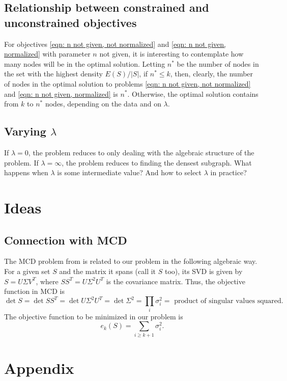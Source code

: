 \documentclass{article}
\begin{document}
\subsection{Relationship between constrained and unconstrained objectives}
For objectives \ref{eqn: n not given, not normalized} and \ref{eqn: n not given, normalized} with parameter $n$ not given, it is interesting to contemplate how many nodes will be in the optimal solution. Letting $n^*$ be the number of nodes in the set with the highest density $E(S)/|S|$,
if $n^* \leq k$, then, clearly, the number of nodes in the optimal solution to problems \ref{eqn: n not given, not normalized} and \ref{eqn: n not given, normalized} is $n^*$. Otherwise, the optimal solution contains from $k$ to $n^*$ nodes, depending on the data and on $\lambda$.

\subsection{Varying $\lambda$}
If $\lambda = 0$, the problem reduces to only dealing with the algebraic structure of the problem. If $\lambda = \infty$, the problem reduces to finding the densest subgraph. What happens when $\lambda$ is some intermediate value? And how to select $\lambda$ in practice?

\section{Ideas}
\subsection{Connection with MCD}
The MCD problem from \cite{bernholt2004complexity} is related to our problem in the following algebraic way. For a given set $S$ and the matrix it spans (call it $S$ too), its SVD is given by $S = U \Sigma V^T$, where $SS^T = U \Sigma^2 U^T$ is the covariance matrix. Thus, the objective function in MCD is $$\det{S} = \det{SS^T} = \det{U \Sigma^2 U^T} = \det{\Sigma^2} = \prod_{i}\sigma_i^2 = \text{ product of singular values squared}.$$ The objective function to be minimized in our problem is $$e_k(S) = \sum_{i \geq k+1}\sigma_i^2.$$

\printbibliography

\section{Appendix}
\end{document}
